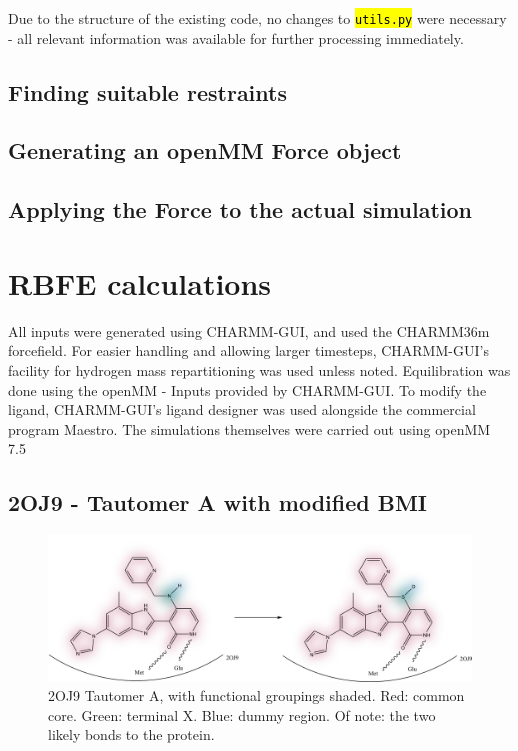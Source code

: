 \documentclass[oneside]{scrreprt}
\newcommand{\code}[1]{\texttt{\hl{#1}}}
\begin{document}
Due to the structure of the existing code, no changes to \code{utils.py} were necessary - all relevant information was available for further processing immediately.
\subsection{Finding suitable restraints}

\subsection{Generating an openMM Force object}

\subsection{Applying the Force to the actual simulation}
\section{RBFE calculations}
All inputs were generated using CHARMM-GUI\cite{Jo2008Aug}, and used the CHARMM36m forcefield\cite{Huang2017Jan}. For easier handling and allowing larger timesteps, CHARMM-GUI's facility for hydrogen mass repartitioning\cite{Gao2021Feb} was used unless noted. Equilibration was done using the openMM - Inputs provided by CHARMM-GUI\cite{Brooks2009Jul,Lee2016Jan}. To modify the ligand, CHARMM-GUI's ligand designer\cite{Guterres2021Nov} was used alongside the commercial program Maestro\cite{maestro}. The simulations themselves were carried out using openMM 7.5\cite{Eastman2017Jul}


\subsection{2OJ9 - Tautomer A with modified BMI}
\begin{figure}[H]
    \centering
    \includegraphics[width=\textwidth]{taapdb24to25.png}
    \caption{2OJ9 Tautomer A, with functional groupings shaded. Red: common core. Green: terminal X. Blue: dummy region. Of note: the two likely bonds to the protein.}
    \label{fig:2oj9_struc_taapdb}
\end{figure}
\end{document}
